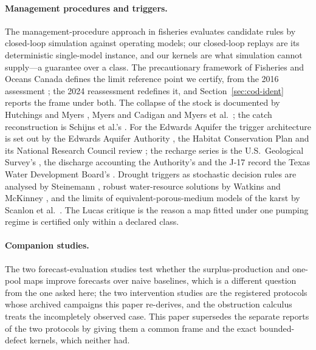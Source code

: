 \paragraph{Management procedures and triggers.}
The management-procedure approach in fisheries \cite{Butterworth2007,Punt2016} evaluates candidate rules by closed-loop simulation against operating models; our closed-loop replays are its deterministic single-model instance, and our kernels are what simulation cannot supply---a guarantee over a class. The precautionary framework of Fisheries and Oceans Canada \cite{DFO2009} defines the limit reference point we certify, from the 2016 assessment \cite{DFO2016}; the 2024 reassessment \cite{Regular2025} redefines it, and Section~\ref{sec:cod-ident} reports the frame under both. The collapse of the stock is documented by Hutchings and Myers \cite{Hutchings1994}, Myers and Cadigan \cite{Myers1995} and Myers et al.\ \cite{Myers1997}; the catch reconstruction is Schijns et al.'s \cite{Schijns2021}. For the Edwards Aquifer the trigger architecture is set out by the Edwards Aquifer Authority \cite{EAA2024}, the Habitat Conservation Plan \cite{EARIP2021} and its National Research Council review \cite{NRC2015}; the recharge series is the U.S.\ Geological Survey's \cite{Umphres2025,Puente1978}, the discharge accounting the Authority's \cite{EAA2023} and the J-17 record the Texas Water Development Board's \cite{TWDB}. Drought triggers as stochastic decision rules are analysed by Steinemann \cite{Steinemann2003}, robust water-resource solutions by Watkins and McKinney \cite{Watkins1997}, and the limits of equivalent-porous-medium models of the karst by Scanlon et al.\ \cite{Scanlon2003}. The Lucas critique \cite{Lucas1976} is the reason a map fitted under one pumping regime is certified only within a declared class.

\paragraph{Companion studies.}
The two forecast-evaluation studies \cite{Abaee2026codforecast,Abaee2026edwforecast} test whether the surplus-production and one-pool maps improve forecasts over naive baselines, which is a different question from the one asked here; the two intervention studies \cite{Abaee2026codintervention,Abaee2026edwintervention} are the registered protocols whose archived campaigns this paper re-derives, and the obstruction calculus \cite{Abaee2026obstruction} treats the incompletely observed case. This paper supersedes the separate reports of the two protocols by giving them a common frame and the exact bounded-defect kernels, which neither had.
